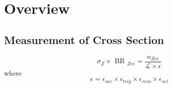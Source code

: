 \chapter{Overview}
\section{Measurement of Cross Section}
\[
\sigma_{ Z } \times \textrm{ BR }_{ Zee } = \frac{ n_{ Zee } }{  \mathcal{ L } \times \epsilon }
\]
where
\[
\epsilon = \epsilon_{ acc } \times \epsilon_{ trig } \times \epsilon_{ reco } \times \epsilon_{ sel }
\]

